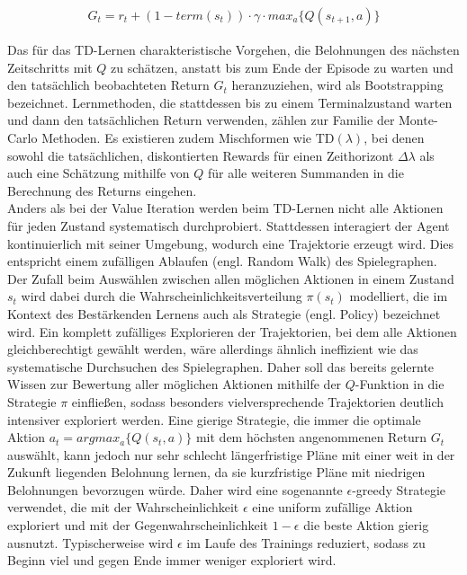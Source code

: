 \begin{equation}
\begin{aligned}
G_t = r_t + (1 - term(s_t)) \cdot \gamma \cdot max_a \{ Q(s_{t+1}, a) \}
\end{aligned}
\end{equation}

Das für das TD-Lernen charakteristische Vorgehen, die Belohnungen des nächsten
Zeitschritts mit $Q$ zu schätzen, anstatt bis zum Ende der Episode zu warten
und den tatsächlich beobachteten Return $G_t$ heranzuziehen, wird als Bootstrapping
bezeichnet. Lernmethoden, die stattdessen bis zu einem Terminalzustand warten und dann
den tatsächlichen Return verwenden, zählen zur Familie der Monte-Carlo Methoden.
Es existieren zudem Mischformen wie TD$(\lambda)$, bei denen sowohl die tatsächlichen,
diskontierten Rewards für einen Zeithorizont $\Delta \lambda$ als auch eine Schätzung
mithilfe von $Q$ für alle weiteren Summanden in die Berechnung des Returns eingehen.\\

Anders als bei der Value Iteration werden beim TD-Lernen nicht alle Aktionen für
jeden Zustand systematisch durchprobiert. Stattdessen interagiert der Agent kontinuierlich
mit seiner Umgebung, wodurch eine Trajektorie erzeugt wird. Dies entspricht einem
zufälligen Ablaufen (engl. Random Walk) des Spielegraphen. Der Zufall beim Auswählen
zwischen allen möglichen Aktionen in einem Zustand $s_t$ wird dabei durch die
Wahrscheinlichkeitsverteilung $\pi(s_t)$ modelliert, die im Kontext des
Bestärkenden Lernens auch als Strategie (engl. Policy) bezeichnet wird.
Ein komplett zufälliges Explorieren der Trajektorien, bei dem alle Aktionen
gleichberechtigt gewählt werden, wäre allerdings ähnlich ineffizient wie das
systematische Durchsuchen des Spielegraphen. Daher soll das bereits gelernte
Wissen zur Bewertung aller möglichen Aktionen mithilfe der $Q$-Funktion in
die Strategie $\pi$ einfließen, sodass besonders vielversprechende Trajektorien
deutlich intensiver exploriert werden. Eine gierige Strategie, die immer die optimale
Aktion $a_t = argmax_{a} \{ Q(s_t, a) \}$ mit dem höchsten angenommenen Return
$G_t$ auswählt, kann jedoch nur sehr schlecht längerfristige Pläne mit einer weit
in der Zukunft liegenden Belohnung lernen, da sie kurzfristige Pläne mit niedrigen
Belohnungen bevorzugen würde. Daher wird eine sogenannte $\epsilon$-greedy Strategie
verwendet, die mit der Wahrscheinlichkeit $\epsilon$ eine uniform zufällige Aktion
exploriert und mit der Gegenwahrscheinlichkeit $1 - \epsilon$ die beste Aktion
gierig ausnutzt. Typischerweise wird $\epsilon$ im Laufe des Trainings reduziert,
sodass zu Beginn viel und gegen Ende immer weniger exploriert wird.

